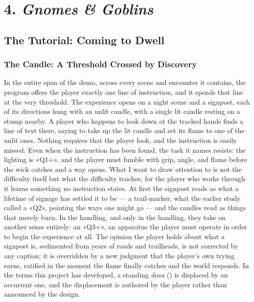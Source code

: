 
\section*{4. \textit{Gnomes \& Goblins}}

\subsection*{The Tutorial: Coming to Dwell}

\subsubsection*{The Candle: A Threshold Crossed by Discovery}

In the entire span of the demo, across every scene and encounter it contains, the program offers the player exactly one line of instruction, and it spends that line at the very threshold. The experience opens on a night scene and a signpost, each of its directions hung with an unlit candle, with a single lit candle resting on a stump nearby. A player who happens to look down at the tracked hands finds a line of text there, saying to take up the lit candle and set its flame to one of the unlit ones. Nothing requires that the player look, and the instruction is easily missed. Even when the instruction has been found, the task it names resists: the lighting is «Q1+», and the player must fumble with grip, angle, and flame before the wick catches and a way opens. What I want to draw attention to is not the difficulty itself but what the difficulty teaches, for the player who works through it learns something no instruction states. At first the signpost reads as what a lifetime of signage has settled it to be — a trail-marker, what the earlier study called a «Q2», pointing the ways one might go — and the candles read as things that merely burn. In the handling, and only in the handling, they take on another sense entirely: an «Q3+», an apparatus the player must operate in order to begin the experience at all. The opinion the player holds about what a signpost is, sedimented from years of roads and trailheads, is not corrected by any caption; it is overridden by a new judgment that the player's own trying earns, ratified in the moment the flame finally catches and the world responds. In the terms this project has developed, a standing \textit{doxa} () is displaced by an occurrent one, and the displacement is authored by the player rather than announced by the design.


